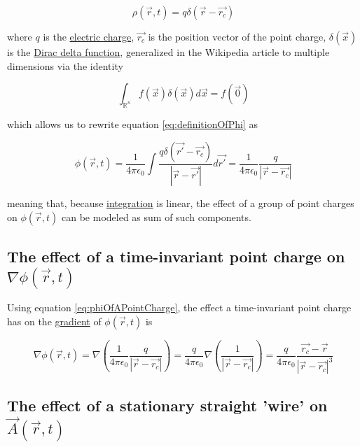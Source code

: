 ﻿\documentclass{article}
\begin{document}
\begin{equation}
    \label{eq:chargeDensityOfAPointCharge}
    \rho(\vec{r}, t) = q \delta(\vec{r} - \vec{r_c})
\end{equation}

where $q$ is the \href{https://en.wikipedia.org/wiki/Electric_charge}{electric charge}, $\vec{r_c}$ is the position vector of the point charge, $\delta(\vec{x})$ is the \href{https://en.wikipedia.org/wiki/Dirac_delta_function}{Dirac delta function}, generalized in the Wikipedia article to 
multiple dimensions via the identity

\begin{equation}
    \label{eq:DiracDeltaIdentityInMultipleDimensions}
    \int_{\mathbb{R}^n} f(\vec{x}) \delta(\vec{x}) d\vec{x} = f(\vec{0})
\end{equation}

which allows us to rewrite equation \ref{eq:definitionOfPhi} as

\begin{equation}
    \label{eq:phiOfAPointCharge}
    \phi(\vec{r}, t) = \frac{1}{4 \pi \epsilon_0} \int \frac{q \delta(\vec{r'} - \vec{r_c})}{|\vec{r} - \vec{r'}|} d \vec{r'} = \frac{1}{4 \pi \epsilon_0} \frac{q}{|\vec{r} - \vec{r_c}|}
\end{equation}

meaning that, because \href{https://en.wikipedia.org/wiki/Integral}{integration} is linear, the effect of a group of point charges on $\phi(\vec{r}, t)$ can be modeled as sum of such components.

\subsection{The effect of a time-invariant point charge on $\nabla \phi(\vec{r}, t)$}

Using equation \ref{eq:phiOfAPointCharge}, the effect a time-invariant point charge has on the \href{https://en.wikipedia.org/wiki/Gradient}{gradient} of $\phi(\vec{r}, t)$ is

\begin{equation}
    \label{eq:gradientOfPhiOfAPointCharge}
    \nabla \phi(\vec{r}, t) = \nabla \left( \frac{1}{4 \pi \epsilon_0} \frac{q}{|\vec{r} - \vec{r_c}|} \right) = \frac{q}{4 \pi \epsilon_0} \nabla \left( \frac{1}{|\vec{r} - \vec{r_c}|} \right) = \frac{q}{4 \pi \epsilon_0} \frac{\vec{r_c} - \vec{r}}{|\vec{r} - \vec{r_c}|^3}
\end{equation}

\subsection{The effect of a stationary straight 'wire' on $\vec{A}(\vec{r}, t)$}
\end{document}
